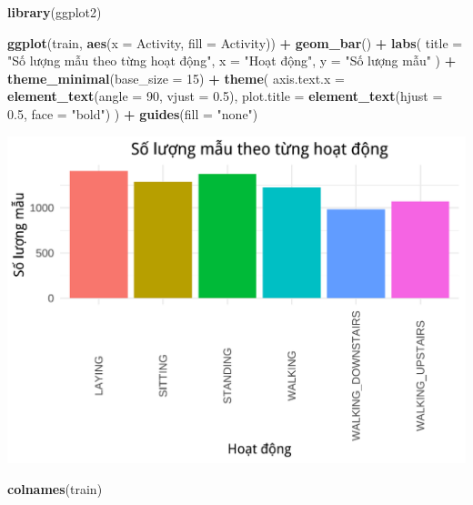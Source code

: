 \documentclass[
]{article}
\newenvironment{Shaded}{\begin{snugshade}}{\end{snugshade}}
\newcommand{\AttributeTok}[1]{\textcolor[rgb]{0.13,0.29,0.53}{#1}}
\newcommand{\DecValTok}[1]{\textcolor[rgb]{0.00,0.00,0.81}{#1}}
\newcommand{\FloatTok}[1]{\textcolor[rgb]{0.00,0.00,0.81}{#1}}
\newcommand{\FunctionTok}[1]{\textcolor[rgb]{0.13,0.29,0.53}{\textbf{#1}}}
\newcommand{\NormalTok}[1]{#1}
\newcommand{\SpecialCharTok}[1]{\textcolor[rgb]{0.81,0.36,0.00}{\textbf{#1}}}
\newcommand{\StringTok}[1]{\textcolor[rgb]{0.31,0.60,0.02}{#1}}
\begin{document}
\begin{Shaded}
\begin{Highlighting}[]
\FunctionTok{library}\NormalTok{(ggplot2)}

\FunctionTok{ggplot}\NormalTok{(train, }\FunctionTok{aes}\NormalTok{(}\AttributeTok{x =}\NormalTok{ Activity, }\AttributeTok{fill =}\NormalTok{ Activity)) }\SpecialCharTok{+}
  \FunctionTok{geom\_bar}\NormalTok{() }\SpecialCharTok{+}
  \FunctionTok{labs}\NormalTok{(}
    \AttributeTok{title =} \StringTok{"Số lượng mẫu theo từng hoạt động"}\NormalTok{,}
    \AttributeTok{x =} \StringTok{"Hoạt động"}\NormalTok{,}
    \AttributeTok{y =} \StringTok{"Số lượng mẫu"}
\NormalTok{  ) }\SpecialCharTok{+}
  \FunctionTok{theme\_minimal}\NormalTok{(}\AttributeTok{base\_size =} \DecValTok{15}\NormalTok{) }\SpecialCharTok{+}
  \FunctionTok{theme}\NormalTok{(}
    \AttributeTok{axis.text.x =} \FunctionTok{element\_text}\NormalTok{(}\AttributeTok{angle =} \DecValTok{90}\NormalTok{, }\AttributeTok{vjust =} \FloatTok{0.5}\NormalTok{),}
    \AttributeTok{plot.title =} \FunctionTok{element\_text}\NormalTok{(}\AttributeTok{hjust =} \FloatTok{0.5}\NormalTok{, }\AttributeTok{face =} \StringTok{"bold"}\NormalTok{)}
\NormalTok{  ) }\SpecialCharTok{+}
  \FunctionTok{guides}\NormalTok{(}\AttributeTok{fill =} \StringTok{"none"}\NormalTok{)}
\end{Highlighting}
\end{Shaded}

\includegraphics{report_files/figure-latex/unnamed-chunk-11-1.pdf}

\begin{Shaded}
\begin{Highlighting}[]
\FunctionTok{colnames}\NormalTok{(train)}
\end{Highlighting}
\end{Shaded}
\end{document}

